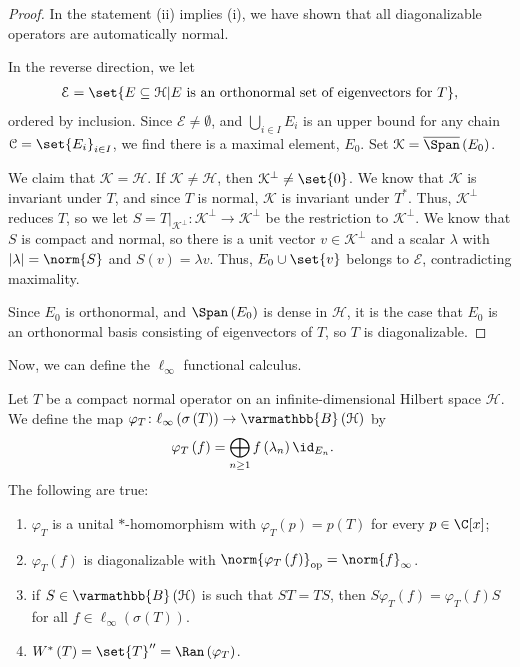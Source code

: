 \documentclass[10pt]{mypackage}
\renewcommand*{\mathbb}[1]{\varmathbb{#1}}
\newcommand{\B}{\mathbb{B}}
\begin{document}
\begin{proof}
  In the statement (ii) implies (i), we have shown that all diagonalizable operators are automatically normal.\newline

  In the reverse direction, we let 
  \begin{align*}
    \mathcal{E} = \set{E\subseteq \mathcal{H} | E\text{ is an orthonormal set of eigenvectors for }T},
  \end{align*}
  ordered by inclusion. Since $\mathcal{E} \neq \emptyset$, and $\bigcup_{i\in I} E_i$ is an upper bound for any chain $\mathcal{C} = \set{E_i}_{i\in I}$, we find there is a maximal element, $E_0$. Set $\mathcal{K} = \overline{\Span}\left(E_0\right)$.\newline

  We claim that $\mathcal{K} = \mathcal{H}$. If $\mathcal{K}\neq \mathcal{H}$, then $\mathcal{K}^{\perp}\neq \set{0}$. We know that $\mathcal{K}$ is invariant under $T$, and since $T$ is normal, $\mathcal{K}$ is invariant under $T^{\ast}$. Thus, $\mathcal{K}^{\perp}$ reduces $T$, so we let $S = T|_{\mathcal{K}^{\perp}}\colon \mathcal{K}^{\perp}\rightarrow \mathcal{K}^{\perp}$ be the restriction to $\mathcal{K}^{\perp}$. We know that $S$ is compact and normal, so there is a unit vector $v\in \mathcal{K}^{\perp}$ and a scalar $\lambda$ with $\left\vert \lambda \right\vert = \norm{S}$ and $S\left(v\right) = \lambda v$. Thus, $E_0\cup \set{v}$ belongs to $\mathcal{E}$, contradicting  maximality.\newline

  Since $E_0$ is orthonormal, and $\Span\left(E_0\right)$ is dense in $\mathcal{H}$, it is the case that $E_0$ is an orthonormal basis consisting of eigenvectors of $T$, so $T$ is diagonalizable.
\end{proof}
Now, we can define the $\ell_{\infty}$ functional calculus.
\begin{theorem}
  Let $T$ be a compact normal operator on an infinite-dimensional Hilbert space $\mathcal{H}$. We define the map $\varphi_T\colon \ell_{\infty}\left(\sigma\left(T\right)\right)\rightarrow \B\left(\mathcal{H}\right)$ by
  \begin{align*}
    \varphi_T\left(f\right) &= \bigoplus_{n\geq 1}f\left(\lambda_n\right)\id_{E_n}.
  \end{align*}
  The following are true:
  \begin{enumerate}[(1)]
    \item $\varphi_T$ is a unital $\ast$-homomorphism with $\varphi_T\left(p\right) = p\left(T\right)$ for every $p\in \C[x]$;
    \item $\varphi_T\left(f\right)$ is diagonalizable with $\norm{\varphi_T\left(f\right)}_{\text{op}} = \norm{f}_{\infty}$.
    \item if $S\in \B\left(\mathcal{H}\right)$ is such that $ST = TS$, then $S\varphi_T\left(f\right) = \varphi_T\left(f\right)S$ for all $f\in \ell_{\infty}\left(\sigma\left(T\right)\right)$.
    \item $W^{\ast}\left(T\right) = \set{T}'' = \Ran\left(\varphi_T\right)$.
  \end{enumerate}
\end{theorem}
\end{document}
